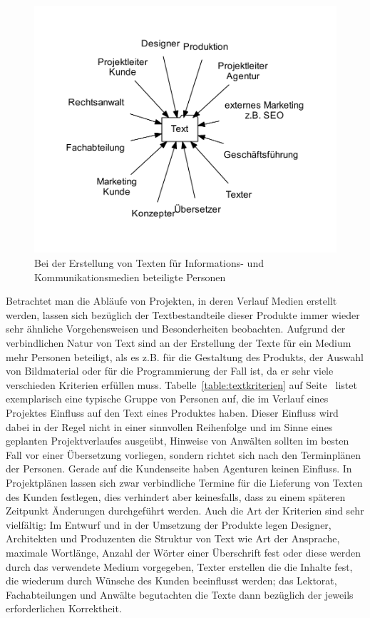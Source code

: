 \begin{figure}[htb]
\begin{center}
\includegraphics[width=\textwidth]{media/chart-2.pdf}
\end{center}
\caption{Bei der Erstellung von Texten für Informations- und Kommunikationsmedien beteiligte Personen}
\label{chart:2}
\end{figure}

Betrachtet man die Abläufe von Projekten, in deren Verlauf Medien erstellt werden, lassen sich bezüglich der Textbestandteile dieser Produkte immer wieder sehr ähnliche Vorgehensweisen und Besonderheiten beobachten. Aufgrund der verbindlichen Natur von Text sind an der Erstellung der Texte für ein Medium mehr Personen beteiligt, als es z.B. für die Gestaltung des Produkts, der Auswahl von Bildmaterial oder für die Programmierung der Fall ist,  da er sehr viele verschieden Kriterien erfüllen muss. Tabelle~\ref{table:textkriterien} auf Seite~\pageref{table:textkriterien} listet exemplarisch eine typische Gruppe von Personen auf, die im Verlauf eines Projektes Einfluss auf den Text eines Produktes haben. Dieser Einfluss wird dabei in der Regel nicht in einer sinnvollen Reihenfolge und im Sinne eines geplanten Projektverlaufes ausgeübt, Hinweise von Anwälten sollten im besten Fall vor einer Übersetzung vorliegen, sondern richtet sich nach den Terminplänen der Personen. Gerade auf die Kundenseite haben Agenturen keinen Einfluss. In Projektplänen lassen sich zwar verbindliche Termine für die Lieferung von Texten des Kunden festlegen, dies verhindert aber keinesfalls, dass zu einem späteren Zeitpunkt Änderungen durchgeführt werden. Auch die Art der Kriterien sind sehr vielfältig: Im Entwurf und in der Umsetzung der Produkte legen Designer, Architekten und Produzenten die Struktur von Text wie Art der Ansprache, maximale Wortlänge, Anzahl der Wörter einer Überschrift fest oder diese werden durch das verwendete Medium vorgegeben, Texter erstellen die die Inhalte fest, die wiederum durch Wünsche des Kunden beeinflusst werden; das Lektorat, Fachabteilungen und Anwälte begutachten die Texte dann bezüglich der jeweils erforderlichen Korrektheit.

